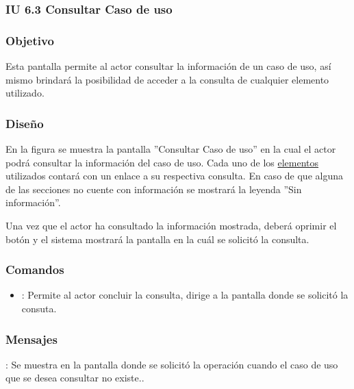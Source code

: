 \subsubsection{IU 6.3 Consultar Caso de uso}

\subsubsection{Objetivo}
	Esta pantalla permite al actor consultar la información de un caso de uso, así mismo brindará la posibilidad de acceder a la consulta de cualquier elemento utilizado.
\subsubsection{Diseño}
	En la figura  se muestra la pantalla ''Consultar Caso de uso'' en la cual el actor podrá consultar la información del caso de uso. Cada uno de los \hyperlink{tElemento}{elementos} utilizados contará con un enlace a su respectiva consulta. En caso de que alguna de las secciones no cuente con información se mostrará la leyenda ''Sin información''.

Una vez que el actor ha consultado la información mostrada, deberá oprimir el botón  y el sistema mostrará la pantalla en la cuál se solicitó la consulta.

\subsubsection{Comandos}
\begin{itemize}
	\item {}: Permite al actor concluir la consulta, dirige a la pantalla donde se solicitó la consuta.
\end{itemize}

\subsubsection{Mensajes}

\begin{Citemize}
	\item {}: Se muestra en la pantalla donde se solicitó la operación cuando el caso de uso que se desea consultar no existe..
\end{Citemize}
